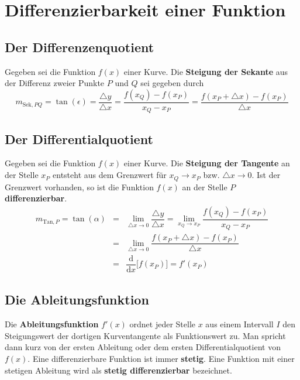 \section{Differenzierbarkeit einer Funktion}
\subsection{Der Differenzenquotient}
Gegeben sei die Funktion $f\left(x\right)$ einer Kurve. Die \textbf{Steigung der Sekante} aus der Differenz zweier Punkte $P$ und $Q$ sei gegeben durch 
\begin{equation}
\boxed{m_{\text{Sek},PQ}=\tan\left(\epsilon\right)=\dfrac{\triangle y}{\triangle x}=\dfrac{f\left(x_Q\right)-f\left(x_P\right)}{x_Q-x_P}=\dfrac{f\left(x_P+\triangle x\right)-f\left(x_P\right)}{\triangle x}}
\end{equation}
\subsection{Der Differentialquotient}
Gegeben sei die Funktion $f\left(x\right)$ einer Kurve. Die \textbf{Steigung der Tangente} an der Stelle $x_P$ entsteht aus dem Grenzwert für $x_Q\rightarrow x_P$ bzw. $\triangle x\rightarrow 0$. Ist der Grenzwert vorhanden, so ist die Funktion $f\left(x\right)$ an der Stelle $P$ \textbf{differenzierbar}.
\begin{equation}
\boxed{\begin{array}{lll}
m_{\text{Tan},P}=\tan\left(\alpha\right)&=&\displaystyle \lim_{\triangle x\rightarrow 0}\dfrac{\triangle y}{\triangle x}=\displaystyle \lim_{x_Q\rightarrow x_P}\dfrac{f\left(x_Q\right)-f\left(x_P\right)}{x_Q-x_P}\\
&=&\displaystyle \lim_{\triangle x\rightarrow 0}\dfrac{f\left(x_P+\triangle x\right)-f\left(x_P\right)}{\triangle x}\\
&=&\dfrac{\text{d}}{\text{d}x}\Big[f\left(x_P\right)\Big]=f'\left(x_P\right)
\end{array}}
\end{equation}
\subsection{Die Ableitungsfunktion}
Die \textbf{Ableitungsfunktion} $f'\left(x\right)$ ordnet jeder Stelle $x$ aus einem Intervall $I$ den Steigungswert der dortigen Kurventangente als Funktionswert zu. Man spricht dann kurz von der ersten Ableitung oder dem ersten Differentialquotient von $f\left(x\right)$.
\newline\newline
Eine differenzierbare Funktion ist immer \textbf{stetig}. Eine Funktion mit einer stetigen Ableitung wird als \textbf{stetig differenzierbar} bezeichnet.
